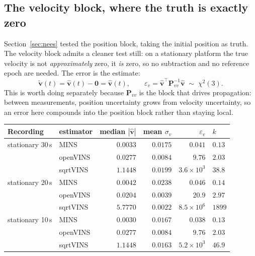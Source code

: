 \subsection{The velocity block, where the truth is exactly zero}
\label{sec:neesvitesse}

Section~\ref{sec:nees} tested the position block, taking the initial
position as truth. The velocity block admits a cleaner test still: on a
stationary platform the true velocity is not \emph{approximately} zero, it
\emph{is} zero, so no subtraction and no reference epoch are needed. The
error is the estimate:
\begin{equation}
\tilde{\mathbf{v}}(t) = \hat{\mathbf{v}}(t) - \mathbf{0} = \hat{\mathbf{v}}(t),
\qquad
\varepsilon_v = \hat{\mathbf{v}}^{\top}\mathbf{P}_{vv}^{-1}\hat{\mathbf{v}}
\;\sim\; \chi^2(3).
\label{eq:neesvel}
\end{equation}
This is worth doing separately because $\mathbf{P}_{vv}$ is the block that
drives propagation: between measurements, position uncertainty grows from
velocity uncertainty, so an error here compounds into the position block
rather than staying local.

\begin{center}
\begin{tabular}{@{}llrrrl@{}}
\toprule
Recording & estimator & median $|\hat{\mathbf{v}}|$ & mean $\sigma_v$ & $\varepsilon_v$ & $k$ \\
\midrule
stationary 30\,s & MINS     & $0.0033$ & $0.0175$ & $0.041$ & $0.13$ \\
                 & openVINS & $0.0277$ & $0.0084$ & $9.76$  & $\mathbf{2.03}$ \\
                 & sqrtVINS & $1.1448$ & $0.0199$ & $3.6\times10^{3}$ & $38.8$ \\
\midrule
stationary 20\,s & MINS     & $0.0042$ & $0.0238$ & $0.046$ & $0.14$ \\
                 & openVINS & $0.0204$ & $0.0039$ & $20.9$  & $\mathbf{2.97}$ \\
                 & sqrtVINS & $5.7770$ & $0.0022$ & $8.5\times10^{6}$ & $1899$ \\
\midrule
stationary 10\,s & MINS     & $0.0030$ & $0.0167$ & $0.038$ & $0.13$ \\
                 & openVINS & $0.0277$ & $0.0084$ & $9.76$  & $\mathbf{2.03}$ \\
                 & sqrtVINS & $1.1448$ & $0.0163$ & $5.2\times10^{3}$ & $46.9$ \\
\bottomrule
\end{tabular}
\end{center}

